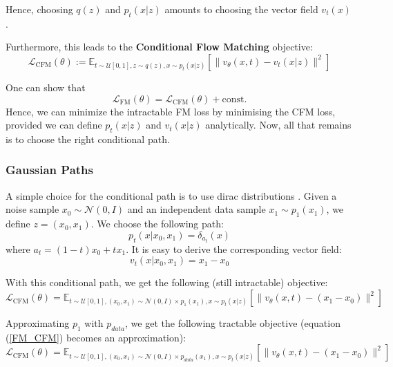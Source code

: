 \documentclass[a4paper,11pt]{article}
\theoremstyle{plain}{\theorembodyfont{\rmfamily}%
\newtheorem{proposition}[theorem]{Proposition}}
\theoremstyle{plain}{\theorembodyfont{\rmfamily}%
\newtheorem{notation}[theorem]{Notation}}
\theoremstyle{plain}{\theorembodyfont{\rmfamily}%
\newtheorem{assumption}[theorem]{Assumption}}
\theoremstyle{plain}{\theorembodyfont{\rmfamily}%
\newtheorem{problem}[theorem]{Problem}}
\theoremstyle{plain}{\theorembodyfont{\rmfamily}%
\newtheorem{example}[theorem]{Example}}
\theoremstyle{plain}{\theorembodyfont{\rmfamily}%
\newtheorem{remark}[theorem]{Remark}}
\theoremstyle{plain}{\theorembodyfont{\rmfamily}%
\newtheorem{definition}[theorem]{Definition}}
\theoremstyle{plain}{\theorembodyfont{\rmfamily}%
\newtheorem{question}[theorem]{Question}}
\numberwithin{equation}{section}
\begin{document}
Hence, choosing $q(z)$ and $p_t(x|z)$ amounts to choosing the vector field $v_t(x)$.

Furthermore, this leads to the \textbf{Conditional Flow Matching} objective:
\begin{equation}
\mathcal{L}_{\text{CFM}}(\theta) := \mathbb{E}_{t\sim \mathcal{U}[0, 1], z \sim q(z), x \sim p_t(x|z)} \left[ \| v_\theta(x, t) - v_t(x|z) \|^2 \right]
\end{equation}

One can show \cite{gagneux2025avisualdive} that
\begin{equation}\label{FM_CFM}
    \mathcal{L}_{\text{FM}}(\theta) = \mathcal{L}_{\text{CFM}}(\theta) + \text{const.}
\end{equation}
Hence, we can minimize the intractable FM loss by minimising the CFM loss, provided we can define $p_t(x|z)$ and $v_t(x|z)$ analytically. Now, all that remains is to choose the right conditional path.

\subsubsection{Gaussian Paths}\label{gaussian_paths}
A simple choice for the conditional path is to use dirac distributions \cite{gagneux2025avisualdive}. Given a noise sample $x_0 \sim \mathcal{N}(0, I)$ and an independent data sample $x_1 \sim p_{1}(x_1)$, we define $z = (x_0, x_1)$. We choose the following path:
\begin{equation}
p_t(x|x_0, x_1) = \delta_{a_t}(x)
\end{equation}
where $a_t = (1-t)x_0 + tx_1$. It is easy to derive the corresponding vector field:
\begin{equation}
v_t(x|x_0, x_1) = x_1 - x_0
\end{equation}

With this conditional path, we get the following (still intractable) objective:
\begin{equation}
\mathcal{L}_{\text{CFM}}(\theta) = \mathbb{E}_{t\sim \mathcal{U}[0, 1], (x_0,x_1) \sim \mathcal{N}(0, I) \times p_{1}(x_1), x \sim p_t(x|z)} \left[ \| v_\theta(x, t) - (x_1 - x_0) \|^2 \right]
\end{equation}

Approximating $p_1$ with $p_{data}$, we get the following tractable objective (equation (\ref{FM_CFM}) becomes an approximation):
\begin{equation}
\mathcal{L}_{\text{CFM}}(\theta) = \mathbb{E}_{t\sim \mathcal{U}[0, 1], (x_0,x_1) \sim \mathcal{N}(0, I) \times p_{data}(x_1), x \sim p_t(x|z)} \left[ \| v_\theta(x, t) - (x_1 - x_0) \|^2 \right]
\end{equation}
\end{document}
